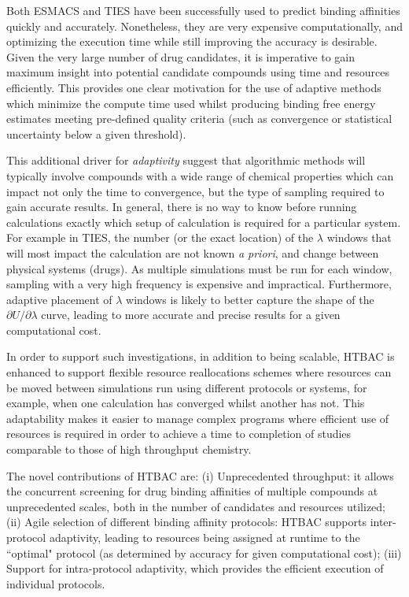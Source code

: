 \documentclass[conference]{IEEEtran}
\begin{document}
Both ESMACS and TIES have been successfully used to predict binding affinities
quickly and accurately. Nonetheless, they are very expensive computationally,
and optimizing the execution time while still improving the accuracy is
desirable. Given the very large number of drug candidates, it is imperative to
gain maximum insight into potential candidate compounds using time and
resources efficiently. This provides one clear motivation for the use of
adaptive methods which minimize the compute time used whilst producing binding
free energy estimates meeting pre-defined quality criteria (such as
convergence or statistical uncertainty below a given threshold).

This additional driver for \textit{adaptivity} suggest that algorithmic methods will
typically involve compounds with a wide range of chemical properties which can
impact not only the time to convergence, but the type of sampling required to
gain accurate results. In general, there is no way to know before running
calculations exactly which setup of calculation is required for a particular
system. For example in TIES, the number (or the exact location) of the
$\lambda$ windows that will most impact the calculation are not known
\textit{a priori}, and change between physical systems (drugs). As multiple
simulations must be run for each window, sampling with a very high frequency
is expensive and impractical. Furthermore, adaptive placement of $\lambda$
windows is likely to better capture the shape of the
$\partial U/\partial\lambda$ curve, leading to more accurate and precise
results for a given computational cost.

In order to support such
investigations, in addition to being scalable, HTBAC is enhanced to
support flexible resource reallocations schemes where resources can be moved
between simulations run using different protocols or systems, for example,
when one calculation has converged whilst another has not. This adaptability
makes it easier to manage complex programs where efficient use of resources
is required in order to achieve a time to completion of studies comparable to
those of high throughput chemistry.

The novel contributions of HTBAC are: (i) Unprecedented throughput: it allows
the concurrent screening for drug binding affinities of multiple compounds at
unprecedented scales, both in the number of candidates and resources utilized;
(ii) Agile selection of different binding affinity protocols: HTBAC supports
inter-protocol adaptivity, leading to resources being assigned at runtime to
the ``optimal" protocol (as determined by accuracy for given computational
cost); (iii) Support for intra-protocol adaptivity, which provides the
efficient execution of individual protocols.
\end{document}
